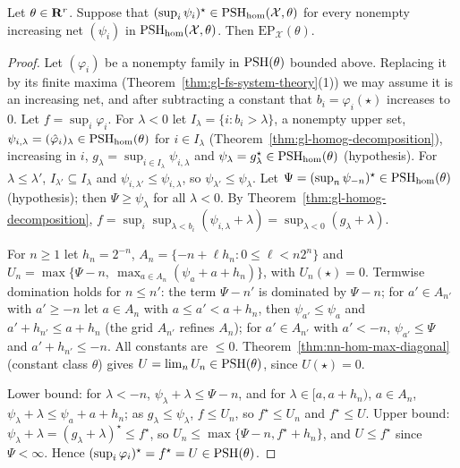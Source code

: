 \begin{proposition}\label{prop:nn-homogeneous-slices}
\leanok
{}
Let $\theta\in\mathbf{R}^r$. Suppose that $(\sup_i\psi_i)^\star\in\operatorname{PSH}_{\mathrm{hom}}(\mathcal X,\theta)$ for every nonempty increasing net $(\psi_i)$ in
$\operatorname{PSH}_{\mathrm{hom}}(\mathcal X,\theta)$. Then $\mathrm{EP}_{\mathcal X}(\theta)$.
\end{proposition}

\begin{proof}
Let $(\varphi_i)$ be a nonempty family in $\operatorname{PSH}(\theta)$ bounded above. Replacing it by its finite maxima (Theorem~\ref{thm:gl-fs-system-theory}(1)) we may
assume it is an increasing net, and after subtracting a constant that $b_i=\varphi_i(\star)$ increases to $0$. Let $f=\sup_i\varphi_i$. For $\lambda<0$ let
$I_\lambda=\{i:b_i>\lambda\}$, a nonempty upper set, $\psi_{i,\lambda}=(\hat\varphi_i)_\lambda\in\operatorname{PSH}_{\mathrm{hom}}(\theta)$ for $i\in I_\lambda$
(Theorem~\ref{thm:gl-homog-decomposition}), increasing in $i$, $g_\lambda=\sup_{i\in I_\lambda}\psi_{i,\lambda}$ and $\psi_\lambda=g_\lambda^\star\in\operatorname{PSH}_{\mathrm{hom}}(\theta)$
(hypothesis). For $\lambda\le\lambda'$, $I_{\lambda'}\subseteq I_\lambda$ and $\psi_{i,\lambda'}\le\psi_{i,\lambda}$, so $\psi_{\lambda'}\le\psi_\lambda$. Let
$\Psi=(\sup_n\psi_{-n})^\star\in\operatorname{PSH}_{\mathrm{hom}}(\theta)$ (hypothesis); then $\Psi\ge\psi_\lambda$ for all $\lambda<0$. By
Theorem~\ref{thm:gl-homog-decomposition}, $f=\sup_i\sup_{\lambda<b_i}(\psi_{i,\lambda}+\lambda)=\sup_{\lambda<0}(g_\lambda+\lambda)$.

For $n\ge1$ let $h_n=2^{-n}$, $A_n=\{-n+\ell h_n:0\le\ell<n2^n\}$ and $U_n=\max\{\Psi-n,\ \max_{a\in A_n}(\psi_a+a+h_n)\}$, with $U_n(\star)=0$. Termwise
domination holds for $n\le n'$: the term $\Psi-n'$ is dominated by $\Psi-n$; for $a'\in A_{n'}$ with $a'\ge-n$ let $a\in A_n$ with $a\le a'<a+h_n$, then
$\psi_{a'}\le\psi_a$ and $a'+h_{n'}\le a+h_n$ (the grid $A_{n'}$ refines $A_n$); for $a'\in A_{n'}$ with $a'<-n$, $\psi_{a'}\le\Psi$ and $a'+h_{n'}\le-n$. All
constants are $\le0$. Theorem~\ref{thm:nn-hom-max-diagonal} (constant class $\theta$) gives $U=\lim_nU_n\in\operatorname{PSH}(\theta)$, since $U(\star)=0$.

Lower bound: for $\lambda<-n$, $\psi_\lambda+\lambda\le\Psi-n$, and for $\lambda\in[a,a+h_n)$, $a\in A_n$, $\psi_\lambda+\lambda\le\psi_a+a+h_n$; as
$g_\lambda\le\psi_\lambda$, $f\le U_n$, so $f^\star\le U_n$ and $f^\star\le U$. Upper bound: $\psi_\lambda+\lambda=(g_\lambda+\lambda)^\star\le f^\star$, so
$U_n\le\max\{\Psi-n,f^\star+h_n\}$, and $U\le f^\star$ since $\Psi<\infty$. Hence $(\sup_i\varphi_i)^\star=f^\star=U\in\operatorname{PSH}(\theta)$.
\end{proof}

